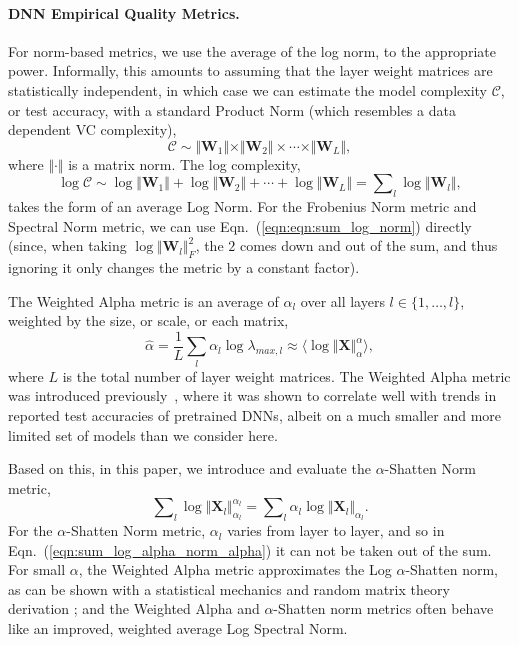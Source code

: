 \paragraph{DNN Empirical Quality Metrics.}

For norm-based metrics, we use the average of the log norm, to the appropriate power.
Informally, this amounts to assuming that the layer weight matrices are statistically independent, in which case we can estimate the model complexity $\mathcal{C}$, or test accuracy, with a standard Product Norm (which resembles a data dependent VC complexity),
\begin{equation}
\mathcal{C}\sim\Vert\mathbf{W}_{1}\Vert\times\Vert\mathbf{W}_{2}\Vert \times \cdots \times \Vert\mathbf{W}_{L}\Vert ,
\end{equation}
where $\Vert\cdot\Vert$ is a matrix norm.   
The log complexity,
\begin{equation}
\label{eqn:eqn:sum_log_norm}
\log\mathcal{C} \sim \log\Vert\mathbf{W}_{1}\Vert+\log\Vert\mathbf{W}_{2}\Vert + \cdots + \log\Vert\mathbf{W}_{L}\Vert = \sum\nolimits_l \log\Vert\mathbf{W}_{l}\Vert ,
\end{equation}
 takes the form of an average Log Norm.
For the Frobenius Norm metric and Spectral Norm metric, we can use Eqn.~(\ref{eqn:eqn:sum_log_norm}) directly (since, when taking $\log\Vert\mathbf{W}_{l}\Vert_{F}^{2}$, the $2$ comes down and out of the sum, and thus ignoring it only changes the metric by a constant factor).


The Weighted Alpha metric is an average of $\alpha_l$ over all layers $l \in \{1,\ldots,l\}$, weighted by the size, or scale, or each matrix,
\begin{equation}
\hat{\alpha} = \dfrac{1}{L}\sum_l \alpha_l\log\lambda_{max,l}\approx\langle\log\Vert\mathbf{X}\Vert_{\alpha}^{\alpha}\rangle    ,
\end{equation}
where $L$ is the total number of layer weight matrices.
The Weighted Alpha metric was introduced previously~\cite{MM20_SDM}, where it was shown to correlate well with trends in reported test accuracies of pretrained DNNs, albeit on a much smaller and more limited set of models than we consider here.

Based on this, in this paper, we introduce and evaluate the $\alpha$-Shatten Norm metric,
\begin{equation}
\label{eqn:sum_log_alpha_norm_alpha}
\sum\nolimits_l \log \Vert\mathbf{X}_l\Vert_{\alpha_l}^{\alpha_l} 
=
\sum\nolimits_l \alpha_l \log \Vert\mathbf{X}_l\Vert_{\alpha_l} .
\end{equation}
For the $\alpha$-Shatten Norm metric, $\alpha_l$ varies from layer to layer, and so in Eqn.~(\ref{eqn:sum_log_alpha_norm_alpha}) it can not be taken out of the sum.
For small $\alpha$, the Weighted Alpha metric approximates the Log $\alpha$-Shatten norm, as can be shown with a statistical mechanics and random matrix theory derivation \cite{MM20_unpub_work}; and the Weighted Alpha and $\alpha$-Shatten norm metrics often behave like an improved, weighted average Log Spectral Norm.


